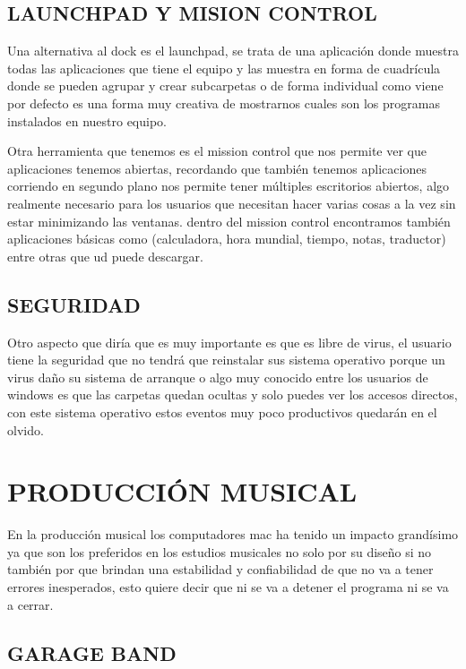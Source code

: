 \subsection*{LAUNCHPAD Y MISION CONTROL}

Una alternativa al dock es el launchpad, se trata de una
aplicación donde muestra todas las aplicaciones que tiene el
equipo y las muestra en forma de cuadrícula donde se pueden
agrupar y crear subcarpetas o de forma individual como viene
por defecto es una forma muy creativa de mostrarnos cuales son
los programas instalados en nuestro equipo.

Otra herramienta que tenemos es el mission control que nos
permite ver que aplicaciones tenemos abiertas, recordando que
también tenemos aplicaciones corriendo en segundo plano nos
permite tener múltiples escritorios abiertos, algo realmente
necesario para los usuarios que necesitan hacer varias cosas a la
vez sin estar minimizando las ventanas. dentro del mission
control encontramos también aplicaciones básicas como
(calculadora, hora mundial, tiempo, notas, traductor) entre otras
que ud puede descargar.

\subsection*{SEGURIDAD}

Otro aspecto que diría que es muy importante es que es libre de
virus, el usuario tiene la seguridad que no tendrá que reinstalar
sus sistema operativo porque un virus daño su sistema de
arranque o algo muy conocido entre los usuarios de windows es
que las carpetas quedan ocultas y solo puedes ver los accesos
directos, con este sistema operativo estos eventos muy poco
productivos quedarán en el olvido.

\section*{PRODUCCIÓN MUSICAL}

En la producción musical los computadores mac ha tenido un
impacto grandísimo ya que son los preferidos en los estudios
musicales no solo por su diseño si no también por que brindan
una estabilidad y confiabilidad de que no va a tener errores
inesperados, esto quiere decir que ni se va a detener el
programa ni se va a cerrar.

\subsection*{GARAGE BAND}

